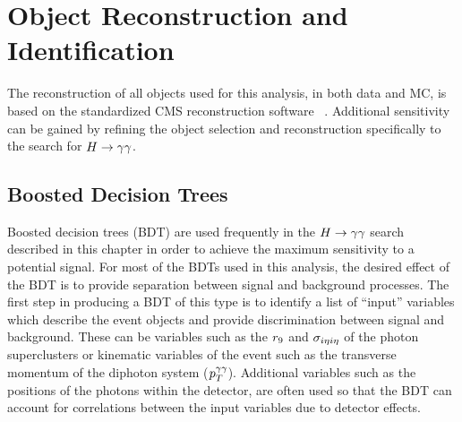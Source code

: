 \section{Object Reconstruction and Identification}
\label{sec:objectrecoandid}

The reconstruction of all objects used for this analysis, in both data and MC,
is based on the standardized CMS reconstruction software \texttt{\cmssw}~\citep{null}. 
Additional sensitivity can be gained by refining the object selection and reconstruction specifically
to the search for $H\rightarrow\gamma\gamma$.

\subsection{Boosted Decision Trees}
\label{sec:bdts}
Boosted decision trees (BDT) are used frequently in the $H\rightarrow\gamma\gamma$ search described in this
chapter in order to achieve the maximum sensitivity to a potential signal.
For most of the BDTs used in this analysis, the desired effect
of the BDT is to provide separation between signal and background processes. 
The first step in producing a BDT of this type is to identify a list of ``input'' 
variables which describe the event objects and provide discrimination 
between signal and background.  
These can be variables such as the $r_{9}$ and $\sigma_{i\eta i\eta}$ 
of the photon superclusters or kinematic variables of the event such as
the transverse momentum of the diphoton system ($p_{T}^{\gamma\gamma}$). 
Additional variables such as the positions of the photons within the detector,
are often used so that the BDT can account for correlations between the 
input variables due to detector effects.

